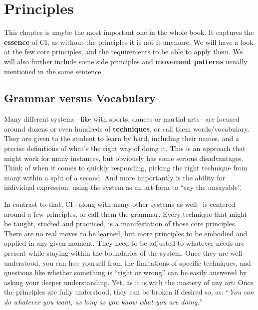 \chapter{Principles}\label{ch:principles}


This chapter is maybe the most important one in the whole book.
It captures the \textbf{essence} of CI, as without the principles it is not it anymore.
We will have a look at the few core principles, and the requirements to be able to apply them.
We will also further include some side principles and \textbf{movement patterns} usually mentioned in the same sentence.

\section{Grammar versus Vocabulary}\label{sec:grammar-versus-vocabulary}

Many different systems --like with sports, dances or martial arts-- are focused around dozens or even hundreds of \textbf{techniques}, or call them words/vocabulary.
They are given to the student to learn by hard, including their names, and a precise definitions of what's the right way of doing it.
This is an approach that might work for many instances, but obviously has some serious disadvantages.
Think of when it comes to quickly responding, picking the right technique from many within a split of a second.
And more importantly is the ability for individual expression: using the system as an art-form to ``say the unsayable''.

In contrast to that, CI --along with many other systems as well-- is centered around a few principles, or call them the grammar.
Every technique that might be taught, studied and practiced, is a manifestation of those core principles.
There are no real moves to be learned, but more principles to be embodied and applied in any given moment.
They need to be adjusted to whatever needs are present while staying within the boundaries of the system.
Once they are well understood, you can free yourself from the limitations of specific techniques, and questions like whether something is ``right or wrong'' can be easily answered by asking your deeper understanding.
Yet, as it is with the mastery of any art: Once the principles are fully understood, they can be broken if desired so, as: ``\textit{You can do whatever you want, as long as you know what you are doing.}''


